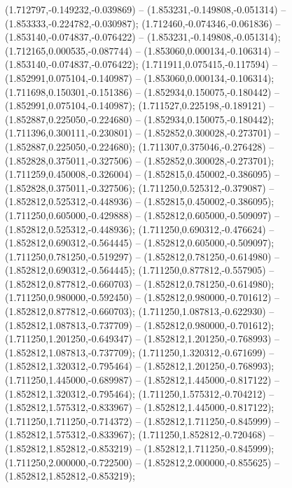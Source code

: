  (1.712797,-0.149232,-0.039869) -- (1.853231,-0.149808,-0.051314) -- (1.853333,-0.224782,-0.030987);
 (1.712460,-0.074346,-0.061836) -- (1.853140,-0.074837,-0.076422) -- (1.853231,-0.149808,-0.051314);
 (1.712165,0.000535,-0.087744) -- (1.853060,0.000134,-0.106314) -- (1.853140,-0.074837,-0.076422);
 (1.711911,0.075415,-0.117594) -- (1.852991,0.075104,-0.140987) -- (1.853060,0.000134,-0.106314);
 (1.711698,0.150301,-0.151386) -- (1.852934,0.150075,-0.180442) -- (1.852991,0.075104,-0.140987);
 (1.711527,0.225198,-0.189121) -- (1.852887,0.225050,-0.224680) -- (1.852934,0.150075,-0.180442);
 (1.711396,0.300111,-0.230801) -- (1.852852,0.300028,-0.273701) -- (1.852887,0.225050,-0.224680);
 (1.711307,0.375046,-0.276428) -- (1.852828,0.375011,-0.327506) -- (1.852852,0.300028,-0.273701);
 (1.711259,0.450008,-0.326004) -- (1.852815,0.450002,-0.386095) -- (1.852828,0.375011,-0.327506);
 (1.711250,0.525312,-0.379087) -- (1.852812,0.525312,-0.448936) -- (1.852815,0.450002,-0.386095);
 (1.711250,0.605000,-0.429888) -- (1.852812,0.605000,-0.509097) -- (1.852812,0.525312,-0.448936);
 (1.711250,0.690312,-0.476624) -- (1.852812,0.690312,-0.564445) -- (1.852812,0.605000,-0.509097);
 (1.711250,0.781250,-0.519297) -- (1.852812,0.781250,-0.614980) -- (1.852812,0.690312,-0.564445);
 (1.711250,0.877812,-0.557905) -- (1.852812,0.877812,-0.660703) -- (1.852812,0.781250,-0.614980);
 (1.711250,0.980000,-0.592450) -- (1.852812,0.980000,-0.701612) -- (1.852812,0.877812,-0.660703);
 (1.711250,1.087813,-0.622930) -- (1.852812,1.087813,-0.737709) -- (1.852812,0.980000,-0.701612);
 (1.711250,1.201250,-0.649347) -- (1.852812,1.201250,-0.768993) -- (1.852812,1.087813,-0.737709);
 (1.711250,1.320312,-0.671699) -- (1.852812,1.320312,-0.795464) -- (1.852812,1.201250,-0.768993);
 (1.711250,1.445000,-0.689987) -- (1.852812,1.445000,-0.817122) -- (1.852812,1.320312,-0.795464);
 (1.711250,1.575312,-0.704212) -- (1.852812,1.575312,-0.833967) -- (1.852812,1.445000,-0.817122);
 (1.711250,1.711250,-0.714372) -- (1.852812,1.711250,-0.845999) -- (1.852812,1.575312,-0.833967);
 (1.711250,1.852812,-0.720468) -- (1.852812,1.852812,-0.853219) -- (1.852812,1.711250,-0.845999);
 (1.711250,2.000000,-0.722500) -- (1.852812,2.000000,-0.855625) -- (1.852812,1.852812,-0.853219);
